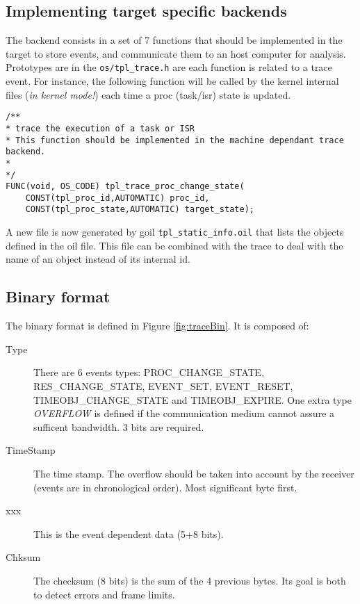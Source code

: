 \subsection{Implementing target specific backends}
\label{sec:trace:targetbackend}

The backend consists in a set of 7 functions that should be implemented in the target to store events, and communicate them to an host computer for analysis. Prototypes are in the \texttt{os/tpl_trace.h} are each function is related to a trace event. For instance, the following function will be called by the kernel internal files (\emph{in kernel mode!}) each time a proc (task/isr) state is updated.

\begin{lstlisting}
/**
* trace the execution of a task or ISR
* This function should be implemented in the machine dependant trace backend.
*
*/
FUNC(void, OS_CODE) tpl_trace_proc_change_state(
    CONST(tpl_proc_id,AUTOMATIC) proc_id,
    CONST(tpl_proc_state,AUTOMATIC) target_state);
\end{lstlisting}

A new file is now generated by goil \texttt{tpl_static_info.oil} that lists the objects defined in the oil file. This file can be combined with the trace to deal with the name of an object instead of its internal id.


\subsection{Binary format}
\label{sec:traceBinFormat}

The binary format is defined in Figure \ref{fig:traceBin}. It is composed of:
\begin{description}
	\item[Type] There are 6 events types: PROC\_CHANGE\_STATE, RES\_CHANGE\_STATE, EVENT\_SET, EVENT\_RESET, TIMEOBJ\_CHANGE\_STATE and TIMEOBJ\_EXPIRE. One extra type \emph{OVERFLOW} is defined if the communication medium cannot assure a sufficent bandwidth. 3 bits are required.
	\item[TimeStamp] The time stamp. The overflow should be taken into account by the receiver (events are in chronological order). Most significant byte first.
	\item[xxx] This is the event dependent data (5+8 bits).
	\item[Chksum] The checksum (8 bits) is the sum of the 4 previous bytes. Its goal is both to detect errors and frame limits.
\end{description}

